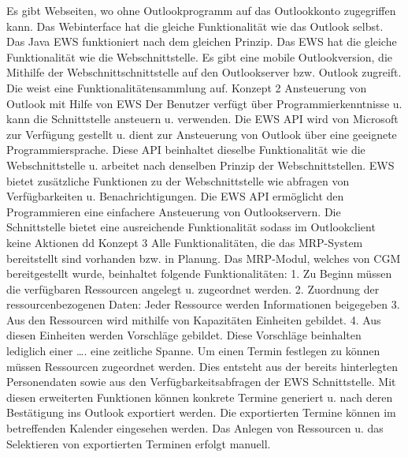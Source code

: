 Es gibt Webseiten, wo ohne Outlookprogramm auf das Outlookkonto zugegriffen kann. Das Webinterface hat die gleiche Funktionalität wie das Outlook selbst. Das Java EWS funktioniert nach dem gleichen Prinzip. Das EWS hat die gleiche Funktionalität wie die Webschnittstelle. Es gibt eine mobile Outlookversion, die Mithilfe der Webschnittschnittstelle auf den Outlookserver bzw. Outlook zugreift. Die weist eine Funktionalitätensammlung auf.
Konzept 2
Ansteuerung von Outlook mit Hilfe von EWS
Der Benutzer verfügt über Programmierkenntnisse u. kann die Schnittstelle ansteuern u. verwenden.
Die EWS API wird von Microsoft zur Verfügung gestellt u. dient zur Ansteuerung von Outlook über eine geeignete Programmiersprache. Diese API beinhaltet dieselbe Funktionalität wie die Webschnittstelle u. arbeitet nach denselben Prinzip der Webschnittstellen. EWS bietet zusätzliche Funktionen zu der Webschnittstelle wie abfragen von Verfügbarkeiten u. Benachrichtigungen. Die EWS API ermöglicht den Programmieren eine einfachere Ansteuerung von Outlookservern. Die Schnittstelle bietet eine ausreichende Funktionalität sodass im Outlookclient keine Aktionen dd
Konzept 3
Alle Funktionalitäten, die das MRP-System bereitstellt sind vorhanden  bzw. in Planung.
Das MRP-Modul, welches von CGM bereitgestellt wurde, beinhaltet folgende Funktionalitäten:
1.	Zu Beginn müssen die verfügbaren Ressourcen angelegt u. zugeordnet werden.  
2.	Zuordnung der ressourcenbezogenen Daten: Jeder  Ressource werden Informationen beigegeben
3.	Aus den Ressourcen wird mithilfe von Kapazitäten Einheiten gebildet.
4.	Aus diesen Einheiten werden Vorschläge gebildet. Diese Vorschläge beinhalten lediglich einer …. eine zeitliche Spanne. Um einen Termin festlegen zu können müssen Ressourcen zugeordnet werden. Dies entsteht aus der bereits hinterlegten Personendaten sowie aus den Verfügbarkeitsabfragen der EWS Schnittstelle. Mit diesen erweiterten Funktionen können konkrete Termine generiert u. nach deren Bestätigung ins Outlook exportiert werden. Die exportierten Termine können im betreffenden Kalender eingesehen werden. Das Anlegen von Ressourcen u. das Selektieren von exportierten Terminen erfolgt manuell.

